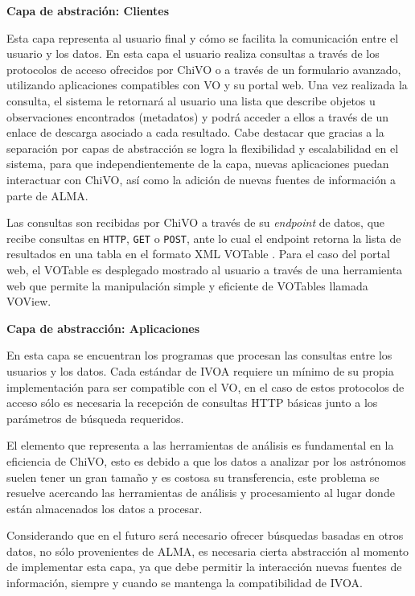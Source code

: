 \textbf{Capa de abstración: Clientes}

Esta capa representa al usuario final y cómo se facilita la comunicación entre el
usuario y los datos.  En esta capa el usuario realiza consultas a través de los
protocolos de acceso ofrecidos por ChiVO o a través de un formulario avanzado,
utilizando aplicaciones compatibles con VO y su portal web.  Una vez realizada
la consulta, el sistema le retornará al usuario una lista que describe objetos
u observaciones encontrados (metadatos) y podrá acceder a ellos a través de un
enlace de descarga asociado a cada resultado.  Cabe destacar que gracias a la
separación por capas de abstracción se logra la flexibilidad y escalabilidad en
el sistema, para que independientemente de la capa, nuevas aplicaciones puedan
interactuar con ChiVO, así como la adición de nuevas fuentes de información a
parte de ALMA.

Las consultas son recibidas por ChiVO a través de su \emph{endpoint} de datos, que
recibe consultas en \texttt{HTTP}, \texttt{GET} o \texttt{POST}, ante lo cual el
endpoint retorna la lista de resultados en una tabla en el formato XML VOTable 
\cite{ochsenbein2011ivoa}.
Para el caso del portal web, el VOTable es desplegado mostrado al usuario a través
de una herramienta web que permite la manipulación simple y eficiente de VOTables
llamada VOView.

\textbf{Capa de abstracción: Aplicaciones}

En esta capa se encuentran los programas que procesan las consultas entre los
usuarios y los datos.
Cada estándar de IVOA requiere un mínimo de su propia implementación para ser
compatible con el VO, en el caso de estos protocolos de acceso sólo es necesaria la
recepción de consultas HTTP básicas junto a los parámetros de búsqueda requeridos.

El elemento que representa a las herramientas de análisis es fundamental en la
eficiencia de ChiVO, esto es debido a que los datos a analizar por los astrónomos
suelen tener un gran tamaño y es costosa su transferencia, este problema se
resuelve acercando las herramientas de análisis y procesamiento al lugar donde están
almacenados los datos a procesar.

Considerando que en el futuro será necesario ofrecer búsquedas
basadas en otros datos, no sólo provenientes de ALMA, es necesaria cierta
abstracción al momento de implementar esta capa, ya que debe permitir la interacción
nuevas fuentes de información, siempre y cuando se mantenga la compatibilidad
de IVOA.

